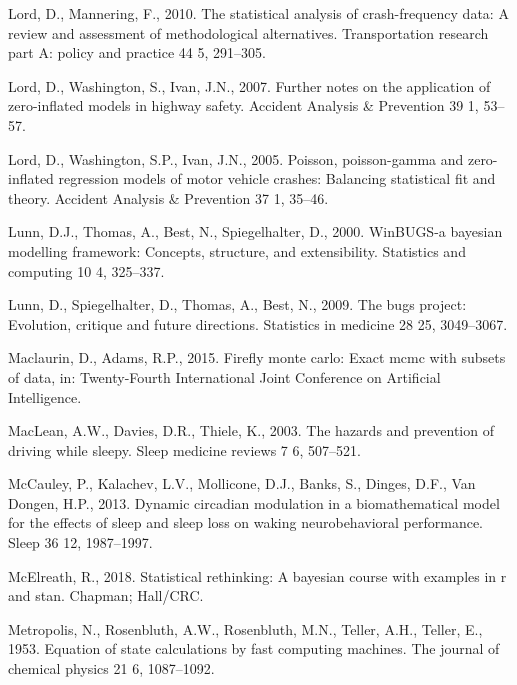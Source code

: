 \documentclass[12pt]{book}
\numberwithin{equation}{chapter}
\begin{document}
\leavevmode\hypertarget{ref-lord2010statistical}{}%
Lord, D., Mannering, F., 2010. The statistical analysis of crash-frequency data: A review and assessment of methodological alternatives. Transportation research part A: policy and practice 44 5, 291--305.

\leavevmode\hypertarget{ref-lord2007further}{}%
Lord, D., Washington, S., Ivan, J.N., 2007. Further notes on the application of zero-inflated models in highway safety. Accident Analysis \& Prevention 39 1, 53--57.

\leavevmode\hypertarget{ref-lord2005poisson}{}%
Lord, D., Washington, S.P., Ivan, J.N., 2005. Poisson, poisson-gamma and zero-inflated regression models of motor vehicle crashes: Balancing statistical fit and theory. Accident Analysis \& Prevention 37 1, 35--46.

\leavevmode\hypertarget{ref-lunn2000winbugs}{}%
Lunn, D.J., Thomas, A., Best, N., Spiegelhalter, D., 2000. WinBUGS-a bayesian modelling framework: Concepts, structure, and extensibility. Statistics and computing 10 4, 325--337.

\leavevmode\hypertarget{ref-lunn2009bugs}{}%
Lunn, D., Spiegelhalter, D., Thomas, A., Best, N., 2009. The bugs project: Evolution, critique and future directions. Statistics in medicine 28 25, 3049--3067.

\leavevmode\hypertarget{ref-maclaurin2015firefly}{}%
Maclaurin, D., Adams, R.P., 2015. Firefly monte carlo: Exact mcmc with subsets of data, in: Twenty-Fourth International Joint Conference on Artificial Intelligence.

\leavevmode\hypertarget{ref-maclean2003hazards}{}%
MacLean, A.W., Davies, D.R., Thiele, K., 2003. The hazards and prevention of driving while sleepy. Sleep medicine reviews 7 6, 507--521.

\leavevmode\hypertarget{ref-mccauley2013dynamic}{}%
McCauley, P., Kalachev, L.V., Mollicone, D.J., Banks, S., Dinges, D.F., Van Dongen, H.P., 2013. Dynamic circadian modulation in a biomathematical model for the effects of sleep and sleep loss on waking neurobehavioral performance. Sleep 36 12, 1987--1997.

\leavevmode\hypertarget{ref-mcelreath2018statistical}{}%
McElreath, R., 2018. Statistical rethinking: A bayesian course with examples in r and stan. Chapman; Hall/CRC.

\leavevmode\hypertarget{ref-metropolis1953equation}{}%
Metropolis, N., Rosenbluth, A.W., Rosenbluth, M.N., Teller, A.H., Teller, E., 1953. Equation of state calculations by fast computing machines. The journal of chemical physics 21 6, 1087--1092.
\end{document}
